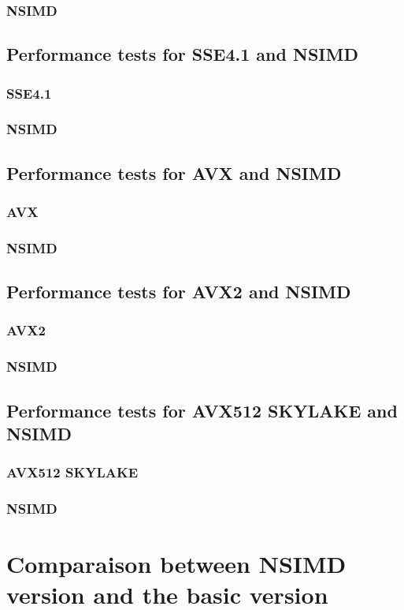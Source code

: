 \subsubsection{NSIMD}
\subsection{Performance tests for SSE4.1 and NSIMD}
\subsubsection{SSE4.1}
\subsubsection{NSIMD}
\subsection{Performance tests for AVX and NSIMD}
\subsubsection{AVX}
\subsubsection{NSIMD}
\subsection{Performance tests for AVX2 and NSIMD}
\subsubsection{AVX2}
\subsubsection{NSIMD}
\subsection{Performance tests for AVX512 SKYLAKE and NSIMD}
\subsubsection{AVX512 SKYLAKE}
\subsubsection{NSIMD}

\section{Comparaison between NSIMD version and the basic version} %

